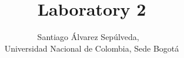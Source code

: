 \documentclass{IEEEtran}
\title{
	Laboratory 2
}
\author{
    Santiago Álvarez Sepúlveda, ~\IEEEmembership{\url{saalvarezse@unal.edu.co}, Cód:~25481031}\\
    Universidad Nacional de Colombia, Sede Bogotá
}
\begin{document}
\maketitle

\IEEEpeerreviewmaketitle
\IEEEtitleabstractindextext
\IEEEpeerreviewmaketitle





\end{document}
